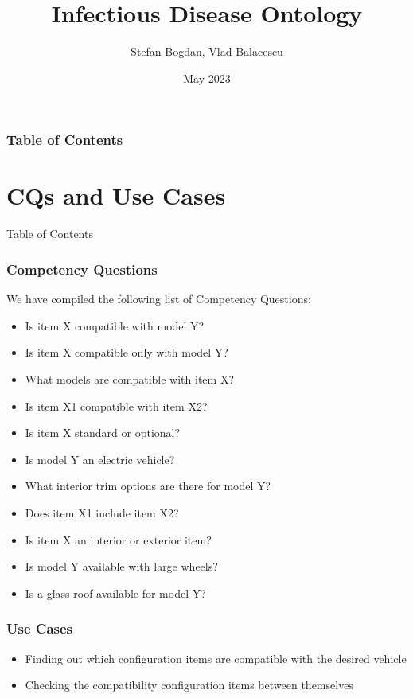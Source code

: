 \documentclass{beamer}
\title{Infectious Disease Ontology}
\author{Stefan Bogdan, Vlad Balacescu}
\institute{Technical University of Cluj-Napoca}
\date{May 2023}
\begin{document}
\frame{\titlepage}

\begin{frame}
\frametitle{Table of Contents}
\tableofcontents
\end{frame}

\section{CQs and Use Cases}

\begin{frame}{Table of Contents}
    \tableofcontents[currentsection]
\end{frame}

\begin{frame}

\frametitle{Competency Questions}

We have compiled the following list of Competency Questions:

\begin{itemize}
\item Is item X compatible with model Y?
\item Is item X compatible only with model Y?
\item What models are compatible with item X?
\item Is item X1 compatible with item X2?
\item Is item X standard or optional?
\item Is model Y an electric vehicle?
\item What interior trim options are there for model Y?
\item Does item X1 include item X2?
\item Is item X an interior or exterior item?
\item Is model Y available with large wheels?
\item Is a glass roof available for model Y?
\end{itemize}
\end{frame}

\begin{frame}
\frametitle{Use Cases}
\begin{itemize}
    \item Finding out which configuration items are compatible with the desired vehicle
    \item Checking the compatibility configuration items between themselves
\end{itemize}
\end{frame}
\end{document}
